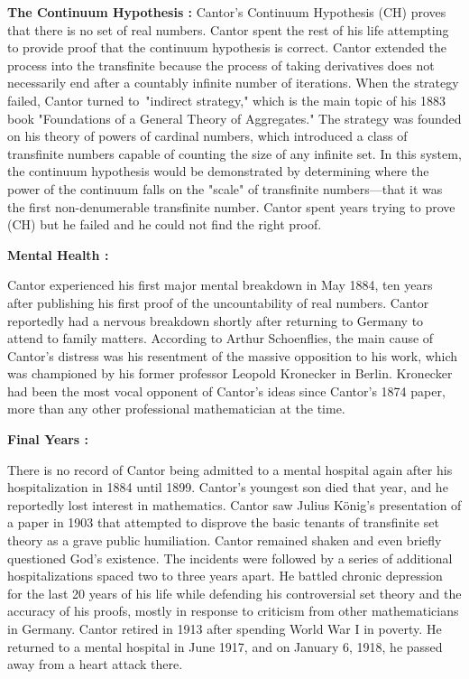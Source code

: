 \documentclass[12pt, a4paper]{article}
\theoremstyle{plain}
\begin{document}
\vspace{0.5cm}
\textbf{The Continuum Hypothesis : }
Cantor’s Continuum Hypothesis (CH) proves that there is no set of real numbers. Cantor spent the rest of his life attempting to provide proof that the continuum hypothesis is correct. Cantor extended the process into the transfinite because the process of taking derivatives does not necessarily end after a countably infinite number of iterations. When the strategy failed, Cantor turned to "indirect strategy," which is the main topic of his 1883 book "Foundations of a General Theory of Aggregates." The strategy was founded on his theory of powers of cardinal numbers, which introduced a class of transfinite numbers capable of counting the size of any infinite set. In this system, the continuum hypothesis would be demonstrated by determining where the power of the continuum falls on the "scale" of transfinite numbers—that it was the first non-denumerable transfinite number. Cantor spent years trying to prove (CH) but he failed and he could not find the right proof. 

\vspace{0.5cm}
\textbf{Mental Health : }

Cantor experienced his first major mental breakdown in May 1884, ten years after publishing his first proof of the uncountability of real numbers. Cantor reportedly had a nervous breakdown shortly after returning to Germany to attend to family matters. According to Arthur Schoenflies, the main cause of Cantor's distress was his resentment of the massive opposition to his work, which was championed by his former professor Leopold Kronecker in Berlin. Kronecker had been the most vocal opponent of Cantor's ideas since Cantor's 1874 paper, more than any other professional mathematician at the time. 

\vspace{0.5cm}
\textbf{Final Years : }

There is no record of Cantor being admitted to a mental hospital again after his hospitalization in 1884 until 1899. Cantor's youngest son died that year, and he reportedly lost interest in mathematics. Cantor saw Julius König's presentation of a paper in 1903 that attempted to disprove the basic tenants of transfinite set theory as a grave public humiliation. Cantor remained shaken and even briefly questioned God's existence. The incidents were followed by a series of additional hospitalizations spaced two to three years apart. He battled chronic depression for the last 20 years of his life while defending his controversial set theory and the accuracy of his proofs, mostly in response to criticism from other mathematicians in Germany. Cantor retired in 1913 after spending World War I in poverty. He returned to a mental hospital in June 1917, and on January 6, 1918, he passed away from a heart attack there.
\newpage
\end{document}
